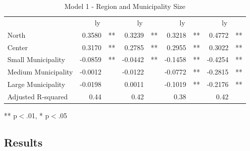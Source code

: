 \documentclass[12pt]{article}
\begin{document}
\begin{spacing}{1.5}
\begin{table}[!ht]
\caption{Model 1 - Region and Municipality Size}
\centering
\begin{tabular}{lllllllll}
\cline{1-9}
\multicolumn{1}{r}{} &
  \multicolumn{2}{c}{ly} &
  \multicolumn{2}{c}{ly} &
  \multicolumn{2}{c}{ly} &
  \multicolumn{2}{c}{ly} \\
\cline{1-9}
\multicolumn{1}{l}{North} &
  \multicolumn{1}{r}{0.3580} &
  \multicolumn{1}{l}{**} &
  \multicolumn{1}{r}{0.3239} &
  \multicolumn{1}{l}{**} &
  \multicolumn{1}{r}{0.3218} &
  \multicolumn{1}{l}{**} &
  \multicolumn{1}{r}{0.4772} &
  \multicolumn{1}{l}{**} \\
\multicolumn{1}{l}{Center} &
  \multicolumn{1}{r}{0.3170} &
  \multicolumn{1}{l}{**} &
  \multicolumn{1}{r}{0.2785} &
  \multicolumn{1}{l}{**} &
  \multicolumn{1}{r}{0.2955} &
  \multicolumn{1}{l}{**} &
  \multicolumn{1}{r}{0.3022} &
  \multicolumn{1}{l}{**} \\
\multicolumn{1}{l}{Small Municipality} &
  \multicolumn{1}{r}{-0.0859} &
  \multicolumn{1}{l}{**} &
  \multicolumn{1}{r}{-0.0442} &
  \multicolumn{1}{l}{**} &
  \multicolumn{1}{r}{-0.1458} &
  \multicolumn{1}{l}{**} &
  \multicolumn{1}{r}{-0.4254} &
  \multicolumn{1}{l}{**} \\
\multicolumn{1}{l}{Medium Municipality} &
  \multicolumn{1}{r}{-0.0012} &
  \multicolumn{1}{l}{} &
  \multicolumn{1}{r}{-0.0122} &
  \multicolumn{1}{l}{} &
  \multicolumn{1}{r}{-0.0772} &
  \multicolumn{1}{l}{**} &
  \multicolumn{1}{r}{-0.2815} &
  \multicolumn{1}{l}{**} \\
\multicolumn{1}{l}{Large Municipality} &
  \multicolumn{1}{r}{-0.0198} &
  \multicolumn{1}{l}{} &
  \multicolumn{1}{r}{0.0011} &
  \multicolumn{1}{l}{} &
  \multicolumn{1}{r}{-0.1019} &
  \multicolumn{1}{l}{**} &
  \multicolumn{1}{r}{-0.2176} &
  \multicolumn{1}{l}{**} \\
\multicolumn{1}{l}{Adjusted R-squared} &
  \multicolumn{1}{r}{0.44} &
  \multicolumn{1}{l}{} &
  \multicolumn{1}{r}{0.42} &
  \multicolumn{1}{l}{} &
  \multicolumn{1}{r}{0.38} &
  \multicolumn{1}{l}{} &
  \multicolumn{1}{r}{0.42} &
  \multicolumn{1}{l}{} \\
\cline{1-9}
\end{tabular}

\footnotesize{
** p$<$.01, * p$<$.05
}
\label{table:reg1}
\end{table}

\end{spacing}

\subsection{Results}
\end{document}
